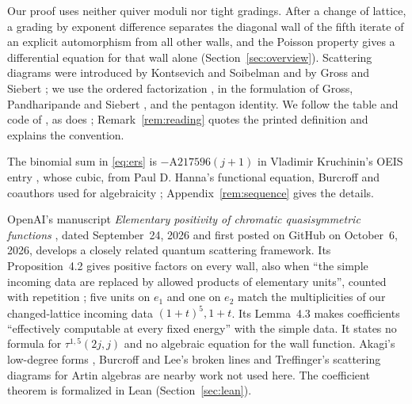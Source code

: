 \documentclass[11pt]{article}
\theoremstyle{definition}
\theoremstyle{remark}
\numberwithin{equation}{section}
\begin{document}
Our proof uses neither quiver moduli nor tight gradings. After a change
of lattice, a grading by exponent difference separates the diagonal wall
of the fifth iterate of an explicit automorphism from all other walls,
and the Poisson property gives a differential equation for that wall
alone (Section~\ref{sec:overview}). Scattering diagrams were introduced
by Kontsevich and Soibelman \cite{KS06} and by Gross and Siebert
\cite{GS11}; we use the ordered factorization \cite[Theorem~6]{KS06},
\cite[Factorization Property]{KS08} in the formulation of Gross,
Pandharipande and Siebert \cite[\S1.3]{GPS}, and the pentagon identity.
We follow the table and code of \cite{ERS}, as does
\cite[(2.2)]{BLMMR}; Remark~\ref{rem:reading} quotes the printed
definition and explains the convention.

The binomial sum in \eqref{eq:ers} is $-\mathrm{A217596}(j+1)$ in Vladimir
Kruchinin's OEIS entry \cite{OEIS}, whose cubic, from Paul D. Hanna's
functional equation, Burcroff and coauthors used for algebraicity
\cite[\S9.3]{BLMMR}; Appendix~\ref{rem:sequence} gives the details.

OpenAI's manuscript \emph{Elementary positivity of chromatic quasisymmetric
functions} \cite{OpenAI}, dated September~24, 2026 and first posted on
GitHub on October~6, 2026, develops a closely related quantum scattering
framework. Its Proposition~4.2 gives positive factors on every wall, also
when ``the simple incoming data are replaced by allowed products of
elementary units'', counted with repetition \cite[\S\S4.1--4.2]{OpenAI};
five units on $e_1$ and one on $e_2$ match the multiplicities of our
changed-lattice incoming data $(1+t)^5,1+t$. Its Lemma~4.3 makes
coefficients ``effectively computable at every fixed energy'' with the
simple data. It states no formula for $\tau^{1,5}(2j,j)$ and no algebraic
equation for the wall function. Akagi's low-degree forms \cite{Akagi23},
Burcroff and Lee's broken lines \cite{BL} and Treffinger's scattering
diagrams for Artin algebras \cite{Treffinger} are nearby work not used
here. The coefficient theorem is formalized in Lean
(Section~\ref{sec:lean}).
\end{document}
